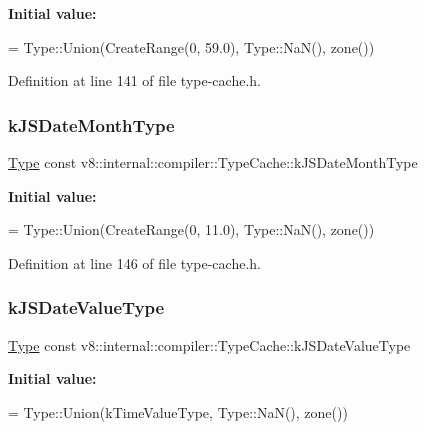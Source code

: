 {\bfseries Initial value\+:}
\begin{DoxyCode}
=
      Type::Union(CreateRange(0, 59.0), Type::NaN(), zone())
\end{DoxyCode}


Definition at line 141 of file type-\/cache.\+h.

\mbox{\label{classv8_1_1internal_1_1compiler_1_1TypeCache_a751ef925cc5e9a61b12579c49f06da5d}} 
\subsubsection{\texorpdfstring{k\+J\+S\+Date\+Month\+Type}{kJSDateMonthType}}
{\footnotesize\ttfamily \mbox{\hyperlink{classv8_1_1internal_1_1compiler_1_1Type}{Type}} const v8\+::internal\+::compiler\+::\+Type\+Cache\+::k\+J\+S\+Date\+Month\+Type}

{\bfseries Initial value\+:}
\begin{DoxyCode}
=
      Type::Union(CreateRange(0, 11.0), Type::NaN(), zone())
\end{DoxyCode}


Definition at line 146 of file type-\/cache.\+h.

\mbox{\label{classv8_1_1internal_1_1compiler_1_1TypeCache_ab3cb8b57263bfdebefd8ba2902425671}} 
\subsubsection{\texorpdfstring{k\+J\+S\+Date\+Value\+Type}{kJSDateValueType}}
{\footnotesize\ttfamily \mbox{\hyperlink{classv8_1_1internal_1_1compiler_1_1Type}{Type}} const v8\+::internal\+::compiler\+::\+Type\+Cache\+::k\+J\+S\+Date\+Value\+Type}

{\bfseries Initial value\+:}
\begin{DoxyCode}
=
      Type::Union(kTimeValueType, Type::NaN(), zone())
\end{DoxyCode}



